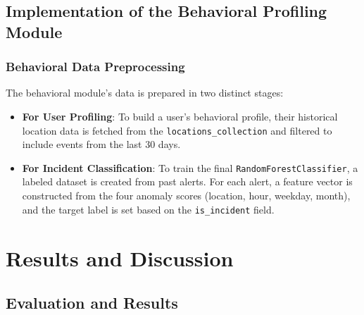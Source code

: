 \documentclass[12pt,a4paper,oneside,english]{book}
\begin{document}
{\section{Implementation of the Behavioral Profiling Module} %
\subsection{Behavioral Data Preprocessing}
The behavioral module's data is prepared in two distinct stages:
\begin{itemize}
    \item \textbf{For User Profiling}: To build a user's behavioral profile, their historical location data is fetched from the \texttt{locations\_collection} and filtered to include events from the last 30 days.
    \item \textbf{For Incident Classification}: To train the final \texttt{RandomForestClassifier}, a labeled dataset is created from past alerts. For each alert, a feature vector is constructed from the four anomaly scores (location, hour, weekday, month), and the target label is set based on the \texttt{is\_incident} field.
\end{itemize}


\chapter{Results and Discussion}
\label{ch:results_and_disc}

\section{Evaluation and Results}
\label{sec:res}
}
\end{document}
